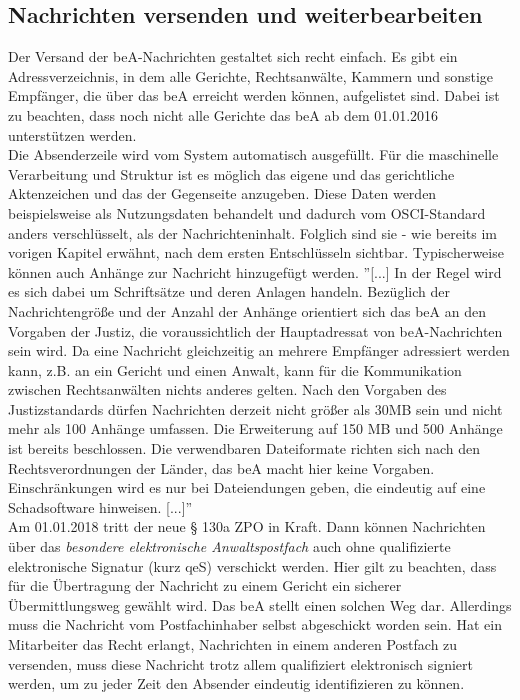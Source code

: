 \subsection{Nachrichten versenden und weiterbearbeiten}
Der Versand der beA-Nachrichten gestaltet sich recht einfach. Es gibt ein Adressverzeichnis, in dem alle Gerichte, Rechtsanwälte, Kammern und sonstige Empfänger, die über das beA erreicht werden können, aufgelistet sind. Dabei ist zu beachten, dass noch nicht alle Gerichte das beA ab dem 01.01.2016 unterstützen werden. \\
Die Absenderzeile wird vom System automatisch ausgefüllt. Für die maschinelle Verarbeitung und Struktur ist es möglich das eigene und das gerichtliche Aktenzeichen und das der Gegenseite anzugeben. Diese Daten werden beispielsweise als Nutzungsdaten behandelt und dadurch vom OSCI-Standard anders verschlüsselt, als der Nachrichteninhalt. Folglich sind sie - wie bereits im vorigen Kapitel erwähnt, nach dem ersten Entschlüsseln sichtbar. Typischerweise können auch Anhänge zur Nachricht hinzugefügt werden. ''[...] In der Regel wird es sich dabei um Schriftsätze und deren Anlagen handeln. Bezüglich der Nachrichtengröße und der Anzahl der Anhänge orientiert sich das beA an den Vorgaben der Justiz, die voraussichtlich der Hauptadressat von beA-Nachrichten sein wird. Da eine Nachricht gleichzeitig an mehrere Empfänger adressiert werden kann, z.B. an ein Gericht und einen Anwalt, kann für die Kommunikation zwischen Rechtsanwälten nichts anderes gelten. Nach den Vorgaben des Justizstandards dürfen Nachrichten derzeit nicht größer als 30MB sein und nicht mehr als 100 Anhänge umfassen. Die Erweiterung auf 150 MB und 500 Anhänge ist bereits beschlossen. Die verwendbaren Dateiformate richten sich nach den Rechtsverordnungen der Länder, das beA macht hier keine Vorgaben. Einschränkungen wird es nur bei Dateiendungen geben, die eindeutig auf eine Schadsoftware hinweisen. [...]'' \cite{bea:bea:brak3-2015} \\
Am 01.01.2018 tritt der neue § 130a ZPO \cite{bea:bea:zpo130} in Kraft. Dann können Nachrichten über das \textit{besondere elektronische Anwaltspostfach} auch ohne qualifizierte elektronische Signatur (kurz qeS) verschickt werden. Hier gilt zu beachten, dass für die Übertragung der Nachricht zu einem Gericht ein sicherer Übermittlungsweg gewählt wird. Das beA stellt einen solchen Weg dar. Allerdings muss die Nachricht vom Postfachinhaber selbst abgeschickt worden sein. Hat ein Mitarbeiter das Recht erlangt, Nachrichten in einem anderen Postfach zu versenden, muss diese Nachricht trotz allem qualifiziert elektronisch signiert werden, um zu jeder Zeit den Absender eindeutig identifizieren zu können. \\
